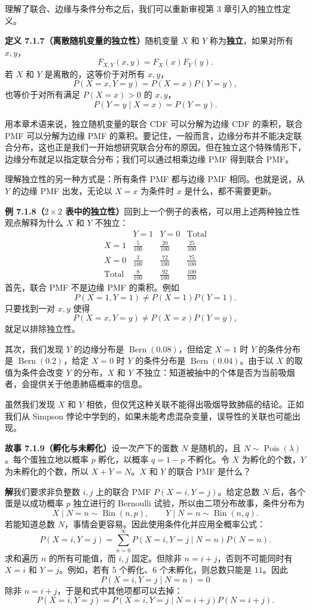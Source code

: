 \documentclass[UTF8, 12pt, fontset=fandol, oneside]{ctexart}
\begin{document}
理解了联合、边缘与条件分布之后，我们可以重新审视第 3 章引入的独立性定义。

\noindent\textbf{定义 7.1.7（离散随机变量的独立性）}\quad 随机变量 $X$ 和 $Y$ 称为\textbf{独立}，如果对所有 $x,y$，
\[
  F_{X,Y}(x,y)=F_X(x)F_Y(y).
\]
若 $X$ 和 $Y$ 是离散的，这等价于对所有 $x,y$，
\[
  P(X=x,Y=y)=P(X=x)P(Y=y),
\]
也等价于对所有满足 $P(X=x)>0$ 的 $x,y$，
\[
  P(Y=y\mid X=x)=P(Y=y).
\]

用本章术语来说，独立随机变量的联合 CDF 可以分解为边缘 CDF 的乘积，联合 PMF 可以分解为边缘 PMF 的乘积。要记住，一般而言，边缘分布并不能决定联合分布，这也正是我们一开始想研究联合分布的原因。但在独立这个特殊情形下，边缘分布就足以指定联合分布；我们可以通过相乘边缘 PMF 得到联合 PMF。

理解独立性的另一种方式是：所有条件 PMF 都与边缘 PMF 相同。也就是说，从 $Y$ 的边缘 PMF 出发，无论以 $X=x$ 为条件时 $x$ 是什么，都不需要更新。

\noindent\textbf{例 7.1.8（$2\times 2$ 表中的独立性）}\quad 回到上一个例子的表格，可以用上述两种独立性观点解释为什么 $X$ 和 $Y$ 不独立：
\[
\begin{array}{c|cc|c}
 & Y=1 & Y=0 & \text{Total}\\ \hline
X=1 & \frac{5}{100} & \frac{20}{100} & \frac{25}{100}\\
X=0 & \frac{3}{100} & \frac{72}{100} & \frac{75}{100}\\ \hline
\text{Total} & \frac{8}{100} & \frac{92}{100} & \frac{100}{100}
\end{array}
\]
首先，联合 PMF 不是边缘 PMF 的乘积。例如
\[
  P(X=1,Y=1)\ne P(X=1)P(Y=1).
\]
只要找到一对 $x,y$ 使得
\[
  P(X=x,Y=y)\ne P(X=x)P(Y=y),
\]
就足以排除独立性。

其次，我们发现 $Y$ 的边缘分布是 $\operatorname{Bern}(0.08)$，但给定 $X=1$ 时 $Y$ 的条件分布是 $\operatorname{Bern}(0.2)$，给定 $X=0$ 时 $Y$ 的条件分布是 $\operatorname{Bern}(0.04)$。由于以 $X$ 的取值为条件会改变 $Y$ 的分布，$X$ 和 $Y$ 不独立：知道被抽中的个体是否为当前吸烟者，会提供关于他患肺癌概率的信息。

虽然我们发现 $X$ 和 $Y$ 相依，但仅凭这种关联不能得出吸烟导致肺癌的结论。正如我们从 Simpson 悖论中学到的，如果未能考虑混杂变量，误导性的关联也可能出现。

\noindent\textbf{故事 7.1.9（孵化与未孵化）}\quad 设一次产下的蛋数 $N$ 是随机的，且 $N\sim \operatorname{Pois}(\lambda)$。每个蛋独立地以概率 $p$ 孵化，以概率 $q=1-p$ 不孵化。令 $X$ 为孵化的个数，$Y$ 为未孵化的个数，所以 $X+Y=N$。$X$ 和 $Y$ 的联合 PMF 是什么？

\noindent\textbf{解}\quad 我们要求非负整数 $i,j$ 上的联合 PMF $P(X=i,Y=j)$。给定总数 $N$ 后，各个蛋是以成功概率 $p$ 独立进行的 Bernoulli 试验，所以由二项分布故事，条件分布为
\[
  X\mid N=n\sim \operatorname{Bin}(n,p),\qquad
  Y\mid N=n\sim \operatorname{Bin}(n,q).
\]
若能知道总数 $N$，事情会更容易。因此使用条件化并应用全概率公式：
\[
  P(X=i,Y=j)=\sum_{n=0}^{\infty}P(X=i,Y=j\mid N=n)P(N=n).
\]
求和遍历 $n$ 的所有可能值，而 $i,j$ 固定。但除非 $n=i+j$，否则不可能同时有 $X=i$ 和 $Y=j$。例如，若有 $5$ 个孵化、$6$ 个未孵化，则总数只能是 $11$。因此
\[
  P(X=i,Y=j\mid N=n)=0
\]
除非 $n=i+j$，于是和式中其他项都可以去掉：
\[
  P(X=i,Y=j)=P(X=i,Y=j\mid N=i+j)P(N=i+j).
\]
\end{document}
